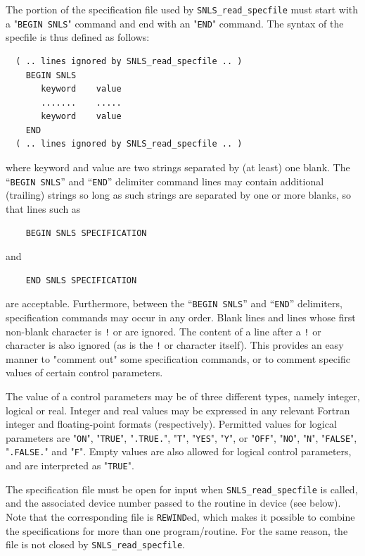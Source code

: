\documentclass{galahad}
\newcommand{\packagename}{SNLS}
\begin{document}
The portion of the specification file used by
{\tt \packagename\_read\_specfile}
must start
with a "{\tt BEGIN \packagename}" command and end with an
"{\tt END}" command.  The syntax of the specfile is thus defined as follows:
\begin{verbatim}
  ( .. lines ignored by SNLS_read_specfile .. )
    BEGIN SNLS
       keyword    value
       .......    .....
       keyword    value
    END
  ( .. lines ignored by SNLS_read_specfile .. )
\end{verbatim}
where keyword and value are two strings separated by (at least) one blank.
The ``{\tt BEGIN \packagename}'' and ``{\tt END}'' delimiter command lines
may contain additional (trailing) strings so long as such strings are
separated by one or more blanks, so that lines such as
\begin{verbatim}
    BEGIN SNLS SPECIFICATION
\end{verbatim}
and
\begin{verbatim}
    END SNLS SPECIFICATION
\end{verbatim}
are acceptable. Furthermore,
between the
``{\tt BEGIN \packagename}'' and ``{\tt END}'' delimiters,
specification commands may occur in any order.  Blank lines and
lines whose first non-blank character is {\tt !} or {\tt *} are ignored.
The content
of a line after a {\tt !} or {\tt *} character is also
ignored (as is the {\tt !} or {\tt *}
character itself). This provides an easy manner to "comment out" some
specification commands, or to comment specific values
of certain control parameters.

The value of a control parameters may be of three different types, namely
integer, logical or real.
Integer and real values may be expressed in any relevant Fortran integer and
floating-point formats (respectively). Permitted values for logical
parameters are "{\tt ON}", "{\tt TRUE}", "{\tt .TRUE.}", "{\tt T}",
"{\tt YES}", "{\tt Y}", or "{\tt OFF}", "{\tt NO}",
"{\tt N}", "{\tt FALSE}", "{\tt .FALSE.}" and "{\tt F}".
Empty values are also allowed for
logical control parameters, and are interpreted as "{\tt TRUE}".

The specification file must be open for
input when {\tt \packagename\_read\_specfile}
is called, and the associated device number
passed to the routine in device (see below).
Note that the corresponding
file is {\tt REWIND}ed, which makes it possible to combine the specifications
for more than one program/routine.  For the same reason, the file is not
closed by {\tt \packagename\_read\_specfile}.
\end{document}
